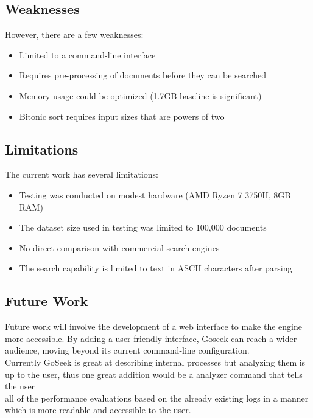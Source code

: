 \subsection{Weaknesses}

However, there are a few weaknesses:

\begin{itemize}
    \item Limited to a command-line interface
    \item Requires pre-processing of documents before they can be searched
    \item Memory usage could be optimized (1.7GB baseline is significant)
    \item Bitonic sort requires input sizes that are powers of two
\end{itemize}

\subsection{Limitations}

The current work has several limitations:

\begin{itemize}
    \item Testing was conducted on modest hardware (AMD Ryzen 7 3750H, 8GB RAM)
    \item The dataset size used in testing was limited to 100,000 documents
    \item No direct comparison with commercial search engines
    \item The search capability is limited to text in ASCII characters after parsing
\end{itemize}

\subsection{Future Work}
Future work will involve the development of a web interface to make the engine more accessible. By adding a user-friendly interface, Goseek can reach a wider audience, moving beyond its current command-line configuration. \\
Currently GoSeek is great at describing internal processes but analyzing them is up to the user, thus one great addition would be a analyzer command that tells the user \\
all of the performance evaluations based on the already existing logs in a manner which is more readable and accessible to the user.
